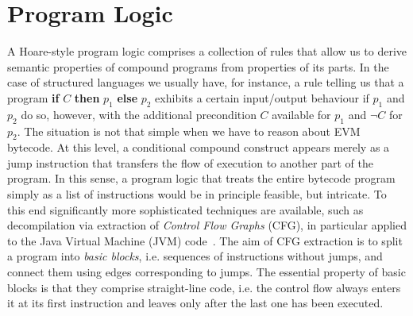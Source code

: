\documentclass[sigplan,10pt,review]{acmart}\settopmatter{printfolios=true,printccs=false,printacmref=false}
\begin{document}
\section{Program Logic}
\label{sec:logic}
A Hoare-style program logic comprises a collection of rules that allow us to derive semantic properties 
of compound programs from properties of its parts. In the case of structured languages 
we usually have, for instance, a rule telling us that a program \textbf{if} $C$ \textbf{then} $p_1$ \textbf{else} $p_2$
exhibits a certain input/output behaviour if $p_1$ and $p_2$ do so, however, with the additional precondition $C$ 
available for $p_1$ and $\neg C$ for $p_2$.
The situation is not that simple when we have to reason about EVM bytecode.
At this level, a conditional compound construct
appears merely as a jump instruction that transfers the flow of execution
to another part of the program.
In this sense, a program logic that treats the entire bytecode program simply as a list of instructions
would be in principle feasible, but intricate. 
%
To this end significantly more sophisticated techniques are available, such as decompilation via extraction of 
\emph{Control Flow Graphs} (CFG), in particular applied to the Java Virtual Machine (JVM) code~\cite{zhao99}.
The aim of CFG extraction is to split a program into \emph{basic blocks}, i.e. sequences of
instructions without jumps, and connect them
using edges corresponding to jumps.
The essential property of basic blocks is that
they comprise straight-line code, i.e. the control flow always enters it at its first instruction
and leaves only after the last one has been executed.
\end{document}
